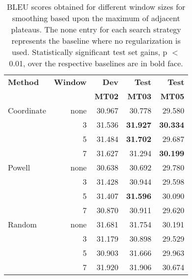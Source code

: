 \documentclass[11pt]{article}
\begin{document}
\begin{table}
\begin{center}
\begin{tabular}{|l|rrrr|}
\hline \bf Method  & \bf Window & \bf Dev & \bf Test & \bf Test \\
                   &            & \bf MT02 & \bf MT03 & \bf MT05 \\ \hline
Coordinate & none &  30.967 & 30.778 & 29.580 \\
           & 3  & 31.536  & {\bf 31.927} & {\bf 30.334} \\
           & 5  & 31.484   & {\bf 31.702}  &  29.687  \\
           & 7  & 31.627 &  31.294 & {\bf 30.199} \\ \hline
Powell     & none & 30.638 & 30.692 & 29.780 \\
           & 3  & 31.428  & 30.944  & 29.598 \\
           & 5  & 31.407  & {\bf 31.596} & 30.090  \\
           & 7  & 30.870  & 30.911 & 29.620  \\ \hline
Random     & none & 31.681 & 31.754 & 30.191 \\
           & 3  & 31.179 & 30.898 & 29.529 \\
           & 5  & 30.903 & 31.666 & 29.963 \\
           & 7  & 31.920 & 31.906 & 30.674 \\
\hline
\end{tabular}
\end{center}
\caption{
\label{minsmoothing}
BLEU scores obtained for different window sizes for smoothing based upon the maximum of adjacent plateaus. 
The none entry for each search strategy represents the baseline where no regularization is used. Statistically significant test set gains, p \mbox{$<$} 0.01, over the respective baselines are in bold face. 
}
\end{table}


\end{document}
